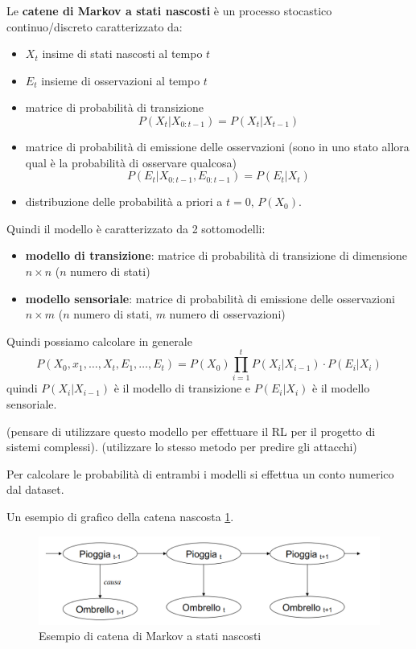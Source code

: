 \begin{definizione}
    Le \textbf{catene di Markov a stati nascosti} è un processo stocastico continuo/discreto
    caratterizzato da:
    \begin{itemize}
        \item $X_t$ insime di stati nascosti al tempo $t$
        \item $E_t$ insieme di osservazioni al tempo $t$
        \item matrice di probabilità di transizione 
        $$P(X_t | X_{0:t-1}) = P(X_t | X_{t-1})$$
        \item matrice di probabilità di emissione delle osservazioni (sono in uno stato allora
        qual è la probabilità di osservare qualcosa) 
        $$P(E_t | X_{0:t-1}, E_{0:t-1}) = P(E_t | X_{t})$$
        \item distribuzione delle probabilità a priori a $t=0$, $P(X_0)$.
    \end{itemize}
\end{definizione}

Quindi il modello è caratterizzato da 2 sottomodelli:
\begin{itemize}
    \item \textbf{modello di transizione}: matrice di probabilità di transizione 
    di dimensione $n\times n$ ($n$ numero di stati)
    \item \textbf{modello sensoriale}: matrice di probabilità di emissione delle 
    osservazioni  $n\times m$ ($n$ numero di stati, $m$ numero di osservazioni)
\end{itemize}

Quindi possiamo calcolare in generale 
$$P(X_0, x_1,\dots,X_t, E_1,\dots, E_t) = P(X_0) \prod_{i=1}^{t}P(X_i|X_{i-1}) \cdot P(E_i|X_i)$$
quindi $P(X_i|X_{i-1})$ è il modello di transizione e $P(E_i|X_i)$ è il modello 
sensoriale.

(pensare di utilizzare questo modello per effettuare il RL per il progetto di sistemi complessi).
(utilizzare lo stesso metodo per predire gli attacchi)

\begin{nota}
    Per calcolare le probabilità di entrambi i modelli si effettua un conto numerico dal 
    dataset.
\end{nota}

Un esempio di grafico della catena nascosta \ref{fig:HMM}.
\begin{figure}
    \centering
    \includegraphics[width=.5\textwidth]{img/catene/hmm.png}
    \caption{Esempio di catena di Markov a stati nascosti}
    \label{fig:HMM}
\end{figure}

